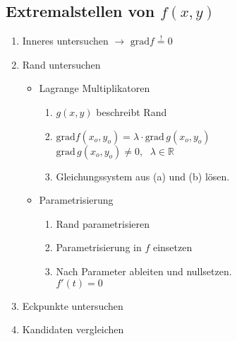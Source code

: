 \subsection{Extremalstellen von $f(x,y)$}
    \vspace{0.25em}
    \begin{enumerate}
        \item Inneres untersuchen $\to$ $\textrm{grad}f \overset{!}{=} 0$
        \item Rand untersuchen
        \begin{itemize}
            \item Lagrange Multiplikatoren
            \begin{enumerate}
                \item $g(x,y)$ beschreibt Rand
                \item $\textrm{grad}f(x_o,y_o) = \lambda \cdot \textrm{grad}\, g(x_o,y_o)$\\[0.25em]
                      \phantom{llll}$\textrm{grad}\, g(x_o,y_o) \neq 0,\phantom{ll} \lambda \in \mathbb{R}$
                \item Gleichungssystem aus (a) und (b) lösen.
            \end{enumerate}
            \item Parametrisierung
            \begin{enumerate}
                \item Rand parametrisieren
                \item Parametrisierung in $f$ einsetzen
                \item Nach Parameter ableiten und nullsetzen.\\[0.25em] \phantom{llll}$f'(t) = 0$
            \end{enumerate}
        \end{itemize}
        \item Eckpunkte untersuchen
        \item Kandidaten vergleichen
    \end{enumerate}